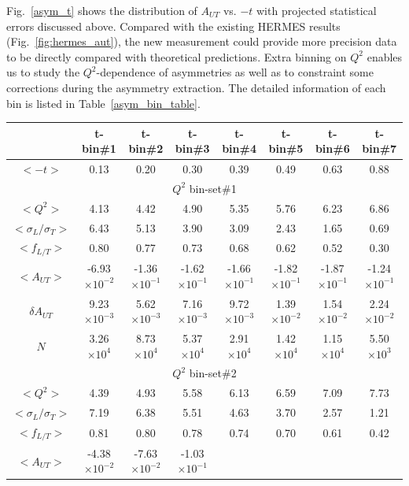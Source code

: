 Fig.~\ref{asym_t} shows the distribution of $A_{UT}$ vs. $-t$ with projected
statistical errors discussed above. Compared with the existing HERMES results
(Fig.~\ref{fig:hermes_aut}), the new measurement could provide more precision
data to be directly compared with theoretical predictions. Extra binning on
$Q^{2}$ enables us to study the $Q^{2}$-dependence of asymmetries as well as to
constraint some corrections during the asymmetry extraction.  The detailed
information of each bin is listed in Table~\ref{asym_bin_table}.

\begin{table}[!ht]
\centering
 \small
\begin{tabular}{|c|c|c|c|c|c|c|c|}
\hline
       &  t-bin\#1 & t-bin\#2 & t-bin\#3 & t-bin\#4 & t-bin\#5 & t-bin\#6 & t-bin\#7 \\
\hline $<-t>$ &  0.13 &  0.20 & 0.30 & 0.39 & 0.49 & 0.63 & 0.88 \\
\hline
\multicolumn{8}{|c|}{$Q^{2}$ bin-set\#1 } \\
\hline
$<Q^{2}>$      &  4.13 &  4.42 & 4.90 & 5.35 & 5.76 & 6.23 & 6.86 \\
$<\sigma_{L}/\sigma_{T}>$   &  6.43 &  5.13 & 3.90 & 3.09 & 2.43 & 1.65 & 0.69 \\
$<f_{L/T}>$    &  0.80 &  0.77 & 0.73 & 0.68 & 0.62 & 0.52 & 0.30 \\
$<A_{UT}>$     &  -6.93$\times 10^{-2}$ &  -1.36$\times 10^{-1}$ & -1.62$\times 10^{-1}$ &
 -1.66$\times 10^{-1}$ & -1.82$\times 10^{-1}$ & -1.87$\times 10^{-1}$ & -1.24$\times 10^{-1}$ \\               
$\delta A_{UT}$&  9.23$\times 10^{-3}$ &  5.62$\times 10^{-3}$ & 7.16$\times 10^{-3}$ & 
9.72$\times 10^{-3}$ & 1.39$\times 10^{-2}$ & 1.54$\times 10^{-2}$ &  2.24$\times 10^{-2}$ \\
$N$           &  3.26$\times 10^{4}$ &  8.73$\times 10^{4}$ & 5.37$\times 10^{4}$ 
& 2.91$\times 10^{4}$ & 1.42$\times 10^{4}$ & 1.15$\times 10^{4}$ & 5.50$\times 10^{3}$ \\
\hline
\multicolumn{8}{|c|}{$Q^{2}$ bin-set\#2 } \\
\hline 
$<Q^{2}>$     &  4.39 &  4.93 & 5.58 & 6.13 & 6.59 & 7.09 & 7.73 \\
$<\sigma_{L}/\sigma_{T}>$&  7.19 &  6.38 & 5.51 & 4.63 & 3.70 & 2.57 & 1.21 \\
$<f_{L/T}>$   &  0.81 &  0.80 & 0.78 & 0.74 & 0.70 & 0.61 & 0.42 \\
$<A_{UT}>$    &  -4.38$\times 10^{-2}$ &  -7.63$\times 10^{-2}$ & -1.03$\times 10^{-1}$ & 

\end{tabular}
\end{table}
